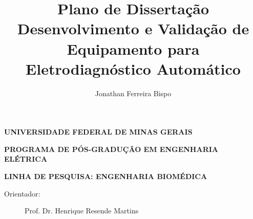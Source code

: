\documentclass[a4paper,10pt]{article}
\title{Plano de Dissertação \\ Desenvolvimento e Validação de Equipamento para Eletrodiagnóstico Automático}
\author{Jonathan Ferreira Bispo}
\date{}
\begin{document}
\maketitle

\begin{center}
  \textbf{UNIVERSIDADE FEDERAL DE MINAS GERAIS}

  \textbf{PROGRAMA DE PÓS-GRADUÇÃO EM ENGENHARIA ELÉTRICA}

  \textbf{LINHA DE PESQUISA: ENGENHARIA BIOMÉDICA}
\end{center}

\begin{description}
  \item [Orientador:] Prof. Dr. Henrique Resende Martins
\end{description}

\newpage

\tableofcontents

\newpage












\end{document}
